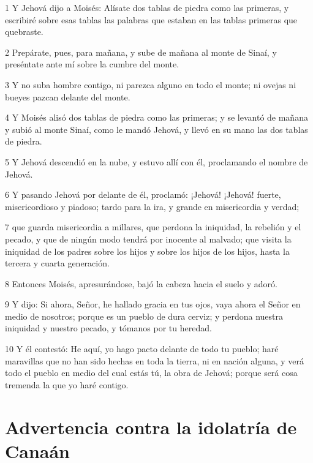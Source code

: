 \par 1 Y Jehová dijo a Moisés: Alísate dos tablas de piedra como las primeras, y escribiré sobre esas tablas las palabras que estaban en las tablas primeras que quebraste.
\par 2 Prepárate, pues, para mañana, y sube de mañana al monte de Sinaí, y preséntate ante mí sobre la cumbre del monte.
\par 3 Y no suba hombre contigo, ni parezca alguno en todo el monte; ni ovejas ni bueyes pazcan delante del monte.
\par 4 Y Moisés alisó dos tablas de piedra como las primeras; y se levantó de mañana y subió al monte Sinaí, como le mandó Jehová, y llevó en su mano las dos tablas de piedra.
\par 5 Y Jehová descendió en la nube, y estuvo allí con él, proclamando el nombre de Jehová.
\par 6 Y pasando Jehová por delante de él, proclamó: ¡Jehová! ¡Jehová! fuerte, misericordioso y piadoso; tardo para la ira, y grande en misericordia y verdad;
\par 7 que guarda misericordia a millares, que perdona la iniquidad, la rebelión y el pecado, y que de ningún modo tendrá por inocente al malvado; que visita la iniquidad de los padres sobre los hijos y sobre los hijos de los hijos, hasta la tercera y cuarta generación.
\par 8 Entonces Moisés, apresurándose, bajó la cabeza hacia el suelo y adoró.
\par 9 Y dijo: Si ahora, Señor, he hallado gracia en tus ojos, vaya ahora el Señor en medio de nosotros; porque es un pueblo de dura cerviz; y perdona nuestra iniquidad y nuestro pecado, y tómanos por tu heredad.
\par 10 Y él contestó: He aquí, yo hago pacto delante de todo tu pueblo; haré maravillas que no han sido hechas en toda la tierra, ni en nación alguna, y verá todo el pueblo en medio del cual estás tú, la obra de Jehová; porque será cosa tremenda la que yo haré contigo.

\section*{Advertencia contra la idolatría de Canaán}

